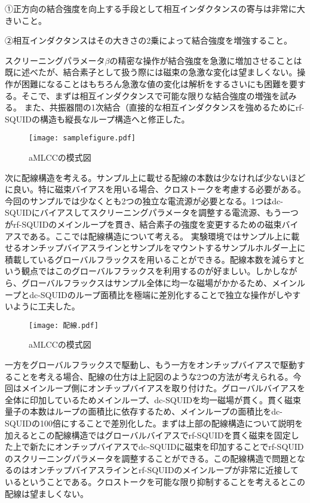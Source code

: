         ①正方向の結合強度を向上する手段として相互インダクタンスの寄与は非常に大きいこと。
        
        ②相互インダクタンスはその大きさの2乗によって結合強度を増強すること。
        
        スクリーニングパラメータ$\beta$の精密な操作が結合強度を急激に増加させることは既に述べたが、結合素子として扱う際には磁束の急激な変化は望ましくない。操作が困難になることはもちろん急激な値の変化は解析をするさいにも困難を要する。そこで、まずは相互インダクタンスで可能な限りな結合強度の増強を試みる。
        また、共振器間の1次結合（直接的な相互インダクタンスを強めるためにrf-SQUIDの構造も縦長なループ構造へと修正した。
        \begin{figure}[H]
            \centering
            \texttt{[image: samplefigure.pdf]}
            \caption{aMLCCの模式図}
        \end{figure}
        次に配線構造を考える。サンプル上に載せる配線の本数は少なければ少ないほどに良い。特に磁束バイアスを用いる場合、クロストークを考慮する必要がある。今回のサンプルでは少なくとも2つの独立な電流源が必要となる。1つはdc-SQUIDにバイアスしてスクリーニングパラメータを調整する電流源、もう一つがrf-SQUIDのメインループを貫き、結合素子の強度を変更するための磁束バイアスである。ここでは配線構造について考える。
        実験環境ではサンプル上に載せるオンチップバイアスラインとサンプルをマウントするサンプルホルダー上に積載しているグローバルフラックスを用いることができる。配線本数を減らすという観点ではこのグローバルフラックスを利用するのが好ましい。しかしながら、グローバルフラックスはサンプル全体に均一な磁場がかかるため、メインループとdc-SQUIDのループ面積比を極端に差別化することで独立な操作がしやすいように工夫した。
        \begin{figure}[H]
            \centering
            \texttt{[image: 配線.pdf]}
            \caption{aMLCCの模式図}
        \end{figure}
        一方をグローバルフラックスで駆動し、もう一方をオンチップバイアスで駆動することを考える場合、配線の仕方は上記図のような2つの方法が考えられる。今回はメインループ側にオンチップバイアスを取り付けた。グローバルバイアスを全体に印加しているためメインループ、dc-SQUIDを均一磁場が貫く。貫く磁束量子の本数はループの面積比に依存するため、メインループの面積比をdc-SQUIDの100倍にすることで差別化した。まずは上部の配線構造について説明を加えるとこの配線構造ではグローバルバイアスでrf-SQUIDを貫く磁束を固定した上で新たにオンチップバイアスでdc-SQUIDに磁束を印加することでrf-SQUIDのスクリーニングパラメータを調整することができる。この配線構造で問題となるのはオンチップバイアスラインとrf-SQUIDのメインループが非常に近接しているということである。クロストークを可能な限り抑制することを考えるとこの配線は望ましくない。
